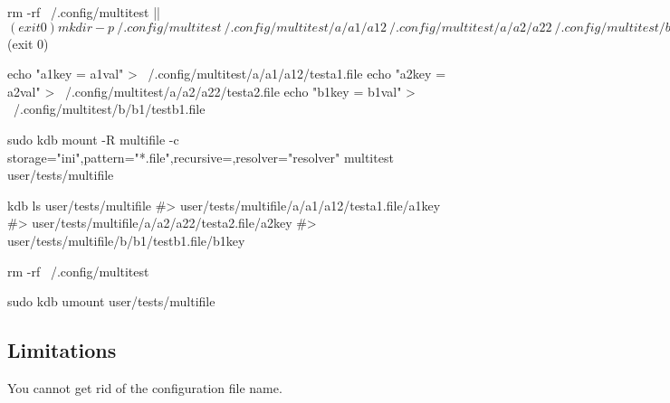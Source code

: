 \begin{DoxyCode}
rm -rf ~/.config/multitest || $(exit 0)
mkdir -p ~/.config/multitest ~/.config/multitest/a/a1/a12 ~/.config/multitest/a/a2/a22
       ~/.config/multitest/b/b1|| $(exit 0)

echo "a1key = a1val" > ~/.config/multitest/a/a1/a12/testa1.file
echo "a2key = a2val" > ~/.config/multitest/a/a2/a22/testa2.file
echo "b1key = b1val" > ~/.config/multitest/b/b1/testb1.file

sudo kdb mount -R multifile -c storage="ini",pattern="*.file",recursive=,resolver="resolver" multitest
       user/tests/multifile

kdb ls user/tests/multifile
#> user/tests/multifile/a/a1/a12/testa1.file/a1key
#> user/tests/multifile/a/a2/a22/testa2.file/a2key
#> user/tests/multifile/b/b1/testb1.file/b1key

rm -rf ~/.config/multitest

sudo kdb umount user/tests/multifile
\end{DoxyCode}


\subsection*{Limitations}


\begin{DoxyItemize}
\item You cannot get rid of the configuration file name. 
\end{DoxyItemize}